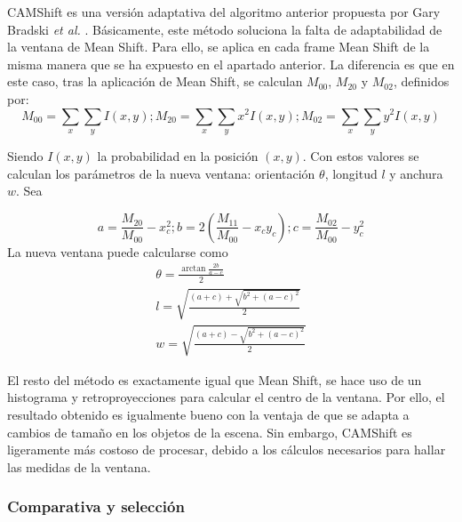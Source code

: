 CAMShift es una versión adaptativa del algoritmo anterior propuesta por Gary Bradski \textit{et al.} \cite{art:camshift}. Básicamente, este método soluciona la falta de adaptabilidad de la ventana de Mean Shift. Para ello, se aplica en cada frame Mean Shift de la misma manera que se ha expuesto en el apartado anterior. La diferencia es que en este caso, tras la aplicación de Mean Shift, se calculan $M_{00}$, $M_{20}$ y $M_{02}$, definidos por:
\[
  M_{00} = \sum_x \sum_y I(x,y) ; M_{20} = \sum_x \sum_y x^2 I(x,y) ; M_{02} = \sum_x \sum_y y^2 I(x,y)
\]

Siendo $I(x,y)$ la probabilidad en la posición $(x,y)$. Con estos valores se calculan los parámetros de la nueva ventana: orientación $\theta$, longitud $l$ y anchura $w$. Sea

\[
a = \frac{M_{20}}{M_{00}} - x_c^2 ; b = 2(\frac{M_{11}}{M_00}-x_cy_c) ; c = \frac{M_{02}}{M_{00}} - y_c^2
\]
La nueva ventana puede calcularse como
\begin{gather*}
  \theta = \frac{\arctan \frac{2b}{a-c}}{2} \\
  l = \sqrt{\frac{(a+c)+\sqrt{b^2+(a-c)^2}}{2}} \\
  w = \sqrt{\frac{(a+c)-\sqrt{b^2+(a-c)^2}}{2}}
\end{gather*}

El resto del método es exactamente igual que Mean Shift, se hace uso de un histograma y retroproyecciones para calcular el centro de la ventana. Por ello, el resultado obtenido es igualmente bueno con la ventaja de que se adapta a cambios de tamaño en los objetos de la escena. Sin embargo, CAMShift es ligeramente más costoso de procesar, debido a los cálculos necesarios para hallar las medidas de la ventana.

\subsubsection*{Comparativa y selección}

